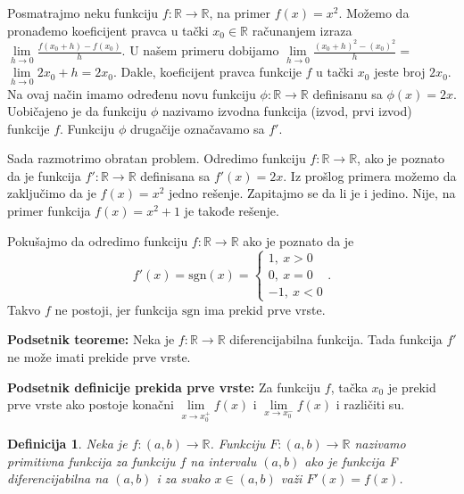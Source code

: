 \documentclass{article}
\newtheorem{definicija}{Definicija}[section]
\begin{document}
Posmatrajmo neku funkciju $f: \mathbb{R} \longrightarrow \mathbb{R}$, na primer
$f\left(x\right) = x^2$. Možemo da pronađemo koeficijent pravca u tački
$x_0 \in \mathbb{R}$ računanjem izraza $\lim\limits_{h \to 0} \frac{f\left(x_0+h\right) - f\left(x_0\right)}{h}$.
U našem primeru dobijamo
$\lim\limits_{h \to 0} \frac{\left(x_0+h\right)^2 - \left(x_0\right)^2}{h} = $
$\lim\limits_{h \to 0} 2 x_0 + h = 2 x_0$.
Dakle, koeficijent pravca funkcije $f$ u tački $x_0$ jeste broj $2 x_0$.
Na ovaj način imamo određenu novu funkciju
$\phi : \mathbb{R} \longrightarrow \mathbb{R}$ definisanu
sa $\phi\left(x\right) = 2 x$. Uobičajeno je da funkciju $\phi$ nazivamo
izvodna funkcija (izvod, prvi izvod) funkcije $f$.
Funkciju $\phi$ drugačije označavamo sa $f'$.\par
Sada razmotrimo obratan problem. Odredimo funkciju $f: \mathbb{R} \longrightarrow \mathbb{R}$,
ako je poznato da je funkcija
$f': \mathbb{R} \longrightarrow \mathbb{R}$ definisana sa
$f'\left(x\right) = 2 x$. Iz prošlog primera možemo da zaključimo da je $f\left(x\right) = x^2$ jedno rešenje. Zapitajmo
se da li je i jedino. Nije, na primer funkcija $f\left(x\right) = x^2 + 1$
je takođe rešenje.\par
Pokušajmo da odredimo funkciju $f: \mathbb{R} \longrightarrow \mathbb{R}$ ako je
poznato da je
$$
    f'\left(x\right) = \text{sgn}\left(x\right)=
    \begin{cases}
        1,\ x > 0 \\
        0,\ x = 0 \\
        -1,\ x < 0
    \end{cases}.
$$
Takvo $f$ ne postoji, jer funkcija $\text{sgn}$ ima prekid prve vrste.

\begin{teoremabox}
    \label{podsetnik_teoreme_1}
    \textbf{Podsetnik teoreme:} Neka je $f: \mathbb{R}\longrightarrow\mathbb{R}$ diferencijabilna funkcija.
    Tada funkcija $f'$ ne može imati prekide prve vrste.
\end{teoremabox}

\begin{defbox}
    \label{podsetnik_definicije_1}
    \textbf{Podsetnik definicije prekida prve vrste:} Za funkciju $f$,
    tačka $x_0$ je prekid prve vrste ako postoje konačni $\lim\limits_{x\rightarrow x_0^+}f\left(x\right)$
    i $\lim\limits_{x\rightarrow x_0^-}f\left(x\right)$ i različiti su.
\end{defbox}

\begin{defbox}
    \label{definicija_1.1}
    \begin{definicija}
        Neka je $f:\left(a, b\right) \longrightarrow \mathbb{R}$.
        Funkciju $F:\left(a, b\right) \longrightarrow \mathbb{R}$ nazivamo primitivna
        funkcija za funkciju $f$ na intervalu $\left(a, b\right)$ ako je funkcija F
        diferencijabilna na $\left(a, b\right)$ i za svako $x \in \left(a,b\right)$ važi
        $F'\left(x\right) = f\left(x\right)$.
    \end{definicija}
\end{defbox}
\end{document}
